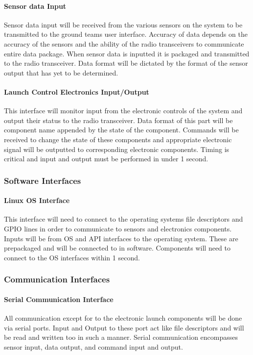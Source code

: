 \documentclass[10pt,draftclsnofoot,onecolumn,retainorgcmds]{IEEEtran}
\begin{document}
\paragraph{\bf Sensor data Input}
Sensor data input will be received from the various sensors on the system to be transmitted to the ground teams user interface. Accuracy of data depends on the accuracy of the sensors and the ability of the radio transceivers to communicate entire data package. When sensor data is inputted it is packaged and transmitted to the radio transceiver. Data format will be dictated by the format of the sensor output that has yet to be determined.

\paragraph{\bf Launch Control Electronics Input/Output}
This interface will monitor input from the electronic controls of the system and output their status to the radio transceiver. Data format of this part will be component name appended by the state of the component. Commands will be received to change the state of these components and appropriate electronic signal will be outputted to corresponding electronic components. Timing is critical and input and output must be performed in under 1 second.


\subsubsection{Software Interfaces}
\paragraph{\bf Linux OS Interface}This interface will need to connect to the operating systems file descriptors and GPIO lines in order to communicate to sensors and electronics components. Inputs will be from OS and API interfaces to the operating system. These are prepackaged and will be connected to in software. Components will need to connect to the OS interfaces within 1 second. 

\subsubsection{Communication Interfaces}
\paragraph {\bf Serial Communication Interface}All communication except for to the electronic launch components will be done via serial ports. Input and Output to these port act like file descriptors and will be read and written too in such a manner. Serial communication encompasses sensor input, data output, and command input and output.
\end{document}
